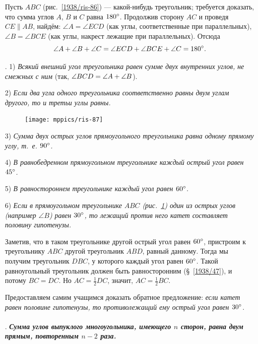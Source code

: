 \documentclass[oneside]{book}
\begin{document}
Пусть $ABC$ (рис.~\ref{1938/ris-86}) — какой-нибудь треугольник;
требуется доказать, что сумма углов $A$, $B$ и $C$ равна $180\degree$.
Продолжив сторону $AC$ и проведя $CE\parallel AB$, найдём:
$\angle A = \angle ECD$ (как углы, соответственные при параллельных), $\angle B = \angle BCE$ (как углы, накрест лежащие при параллельных). 
Отсюда
\[\angle A + \angle B+\angle C = \angle ECD + \angle BCE + \angle C =180\degree.\]

.
1) \emph{Всякий внешний угол треугольника равен сумме двух внутренних углов, не смежных с ним} (так, $\angle BCD \z= \angle A + \angle B$).

2) \emph{Если два угла одного треугольника соответственно равны двум углам другого, то и третьи углы равны.}

\begin{figure}
\vskip-4mm
\centering
\texttt{[image: mppics/ris-87]}
\caption{}\label{1938/ris-87}
\end{figure}

3) \emph{Сумма двух острых углов прямоугольного треугольника равна одному прямому углу, т.~е. $90\degree$.}

4) \emph{В равнобедренном прямоугольном треугольнике каждый острый угол равен $45\degree$.}

5) \emph{В равностороннем треугольнике каждый угол равен $60\degree$.}

6) \emph{Если в прямоугольном треугольнике $ABC$ \emph{(рис.~\ref{1938/ris-87})} один из острых углов \emph{(например $\angle B$)} равен $30\degree$, то лежащий против него катет составляет половину гипотенузы.}

Заметив, что в таком треугольнике другой острый угол равен $60\degree$, пристроим к треугольнику $ABC$ другой треугольник $ABD$, равный данному.
Тогда мы получим треугольник $DBC$, у которого каждый угол равен $60\degree$.
Такой равноугольный треугольник должен быть равносторонним (§~\ref{1938/47}), и потому $BC=DC$.
Но $AC=\tfrac12DC$, значит, $AC=\tfrac12BC$.

Предоставляем самим учащимся доказать обратное предложение:
\emph{если катет равен половине гипотенузы, то противолежащий ему острый угол равен $30\degree$.}

\paragraph{}\label{1938/82}
.
\textbf{\emph{Сумма углов выпуклого многоугольника, имеющего $n$ сторон, равна двум прямым, повторенным $n-2$ раза.}}
\end{document}
